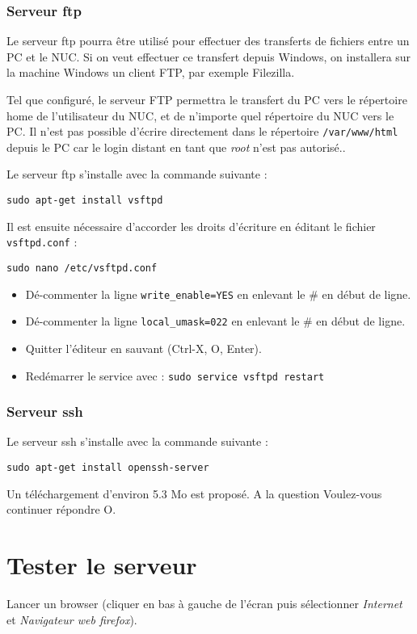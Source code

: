 \documentclass[a4paper]{ffco-rapport}
\begin{document}
	\subsubsection{Serveur ftp}
		Le serveur ftp pourra être utilisé pour effectuer des transferts de fichiers entre un PC et le NUC. Si on veut effectuer ce transfert depuis Windows, on installera sur la machine Windows un client FTP, par exemple Filezilla.
		
		Tel que configuré, le serveur FTP permettra le transfert du PC vers le répertoire \og{}home\fg{} de l'utilisateur du NUC, et de n'importe quel répertoire du NUC vers le PC. Il n'est pas possible d'écrire directement dans le répertoire \verb|/var/www/html| depuis le PC car le login distant en tant que \emph{root} n'est pas autorisé..
	
		Le serveur ftp s'installe avec la commande suivante :
		
		\verb|sudo apt-get install vsftpd|
		
		Il est ensuite nécessaire d'accorder les droits d'écriture en éditant le fichier \verb|vsftpd.conf| :
		
		\verb|sudo nano /etc/vsftpd.conf|
		
		
		\begin{itemize}
			\item Dé-commenter la ligne \verb|write_enable=YES| en enlevant le \# en début de ligne.
			\item Dé-commenter la ligne \verb|local_umask=022| en enlevant le \# en début de ligne.
			\item Quitter l'éditeur en sauvant (Ctrl-X, O, Enter).
			\item Redémarrer le service avec : \verb|sudo service vsftpd restart|
		\end{itemize}
		
		
		
	\subsubsection{Serveur ssh}
		Le serveur ssh s'installe avec la commande suivante :
		
		\verb|sudo apt-get install openssh-server|

		Un téléchargement d'environ 5.3 Mo est proposé. A la question \og{}Voulez-vous continuer\fg{} répondre O.		

\section{Tester le serveur}
		Lancer un browser (cliquer en bas à gauche de l'écran puis sélectionner \emph{Internet} et \emph{Navigateur web firefox}).
		
\end{document}
